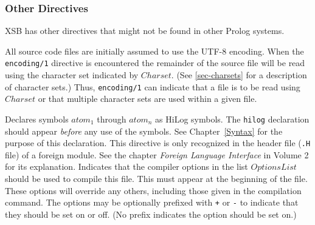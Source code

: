 
\subsubsection{Other Directives} \label{other-directives}

XSB has other directives that might not be found in other Prolog systems.

\begin{description}
%
All source code files are initially assumed to use the UTF-8 encoding.
When the {\tt encoding/1} directive is encountered the remainder of
the source file will be read using the character set indicated by
$Charset$.  (See \ref{sec-charsets} for a description of character
sets.)  Thus, {\tt encoding/1} can indicate that a file is to be read
using $Charset$ or that multiple character sets are used within a
given file.

%
	Declares symbols $atom_1$ through $atom_n$ as HiLog symbols.
	The {\tt hilog} declaration should appear {\em before} any use of
	the symbols.  See Chapter~\ref{Syntax} for the purpose of this
 	declaration.
        This directive is only recognized in the header file ({\tt .H} file) 
	of a foreign module. See the chapter {\it Foreign Language
Interface} in Volume 2 for its explanation.
	Indicates that the compiler options in the list $OptionsList$
	should be used to compile this file.  This must appear at the
	beginning of the file.  These options will override any others,
	including those given in the compilation command.  The options
	may be optionally prefixed with \verb|+| or \verb|-| to
	indicate that they should be set on or off.  (No prefix
	indicates the option should be set on.)

\end{description}


